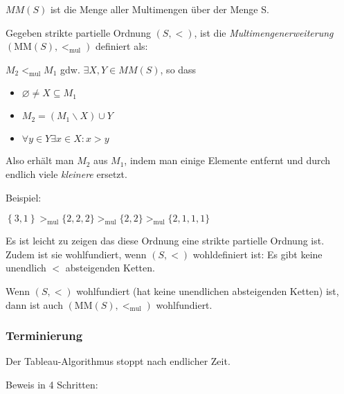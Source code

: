 $MM(S)$ ist die Menge aller Multimengen über der Menge S.

Gegeben strikte partielle Ordnung $\left( S, < \right)$, ist die
\emph{Multimengenerweiterung} $\left( \text{MM}\left( S \right), <_{\text{mul}} \right)$ definiert als: 

$M_2 <_{\text{mul}}M_1$ gdw. $\exists X,Y \in MM(S)$, so dass

\begin{itemize}
\item
  $\varnothing \neq X \subseteq M_1$
\item
  $M_2 = \left( M_1 \smallsetminus X \right) \cup Y$
\item
  $\forall y \in Y\exists x \in X : x > y$
\end{itemize}

Also erhält man $M_2$ aus $M_1$, indem man einige Elemente entfernt und durch endlich viele \emph{kleinere} ersetzt.

Beispiel:

$\left\{ 3,1 \right\} >_{\text{mul}}\{ 2,2,2\} >_{\text{mul}}\{ 2,2\} >_{\text{mul}}\{ 2,1,1,1\}$

Es ist leicht zu zeigen das diese Ordnung eine strikte partielle Ordnung ist.  Zudem ist sie wohlfundiert, wenn $(S,<)$ wohldefiniert ist: Es gibt keine unendlich $<$ absteigenden Ketten.

\setcounter{definition}{5}
\begin{theorem}

Wenn $\left( S, < \right)$ wohlfundiert (hat keine unendlichen
absteigenden Ketten) ist, dann ist auch $\left( \text{MM}\left( S \right), <_{\text{mul}} \right)$
wohlfundiert.
\end{theorem}

\setcounter{definition}{4}

\subsubsection{Terminierung}

\begin{proposition}

Der Tableau-Algorithmus stoppt nach endlicher Zeit.
\end{proposition}
\setcounter{definition}{6}

Beweis in 4 Schritten:

